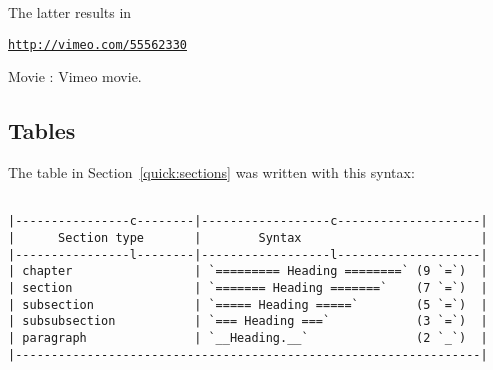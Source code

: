 \documentclass[%
oneside,                 %
final,                   %
10pt]{article}
\newenvironment{doconce:movie}{}{}
\newcounter{doconce:movie:counter}
\begin{document}
The latter results in
\begin{doconce:movie}
\begin{center}\href{{http://vimeo.com/55562330}}{\nolinkurl{http://vimeo.com/55562330}}\end{center}
\begin{center}  %
Movie : Vimeo movie.
\end{center}
\end{doconce:movie}
\subsection{Tables}
The table in Section~\ref{quick:sections} was written with this
syntax:
\begin{Verbatim}[numbers=none,fontsize=\fontsize{9pt}{9pt},baselinestretch=0.95,xleftmargin=2mm]

|----------------c--------|------------------c--------------------|
|      Section type       |        Syntax                         |
|----------------l--------|------------------l--------------------|
| chapter                 | `========= Heading ========` (9 `=`)  |
| section                 | `======= Heading =======`    (7 `=`)  |
| subsection              | `===== Heading =====`        (5 `=`)  |
| subsubsection           | `=== Heading ===`            (3 `=`)  |
| paragraph               | `__Heading.__`               (2 `_`)  |
|-----------------------------------------------------------------|


\end{Verbatim}
\end{document}
